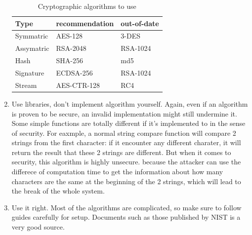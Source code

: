 \documentclass[conference]{IEEEtran}
\begin{document}
\begin{enumerate}[label=\textbf{\arabic*.}]
\begin{table}[H]
    \centering
    \begin{tabular}{ l | l | l}
            Type  & recommendation & out-of-date\\\hline
            Symmatric  & AES-128 & 3-DES\\
            Assymatric & RSA-2048 & RSA-1024\\
            Hash       & SHA-256 & md5\\
            Signature & ECDSA-256 & RSA-1024\\
            Stream  & AES-CTR-128 & RC4
    \end{tabular}
    \caption{Cryptographic algorithms to use}
\end{table}


    \item
Use libraries, don't implement algorithm yourself.
Again, even if an algorithm is proven to be secure, an
invalid implementation might still undermine it.
Some simple functions
are totally different if it's implemented to in the sense of security.
For eaxmple, a normal string compare function will
compare 2 strings from the first character:
if it encounter any different charater, it will return the
result that these 2 strings are different.
But when it comes to security, this algorithm is highly unsecure.
because the attacker can use the differece of computation time
to get the information about how many characters are the same
at the beginning of the 2 strings, which will lead to the break
of the whole system.

    \item
Use it right. Most of the algorithms are complicated, so make sure to
follow guides carefully for setup. 
Documents such as those published by NIST \cite{NIST} is a very good source.
\end{enumerate}

\end{document}
